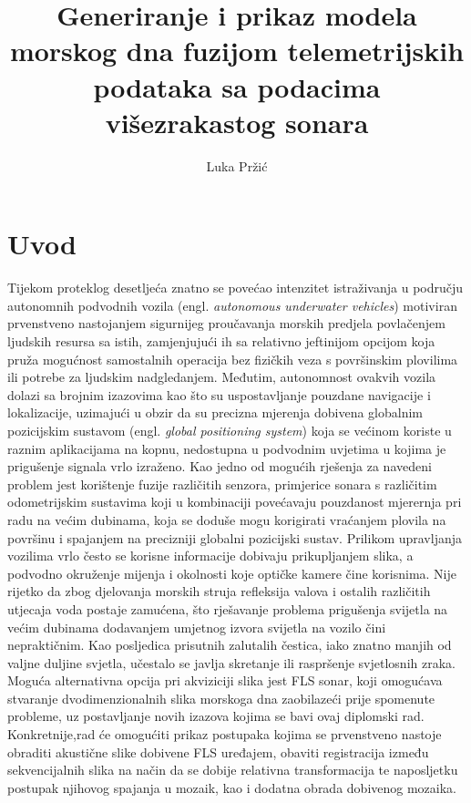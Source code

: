 \documentclass[times, utf8, diplomski]{fer}
\begin{document}

\title{Generiranje i prikaz modela morskog dna fuzijom telemetrijskih podataka sa podacima višezrakastog sonara}

\author{Luka Pržić}
\maketitle
\izvornik

\zahvala{}

\tableofcontents
\chapter{Uvod}
Tijekom proteklog desetljeća znatno se povećao intenzitet istraživanja u području autonomnih podvodnih vozila (engl. \textit{autonomous underwater vehicles}) motiviran prvenstveno nastojanjem sigurnijeg proučavanja morskih predjela povlačenjem ljudskih resursa sa istih, zamjenjujući ih sa relativno jeftinijom opcijom koja pruža mogućnost samostalnih operacija bez fizičkih veza s površinskim plovilima ili potrebe za ljudskim nadgledanjem. Međutim, autonomnost ovakvih vozila dolazi sa brojnim izazovima kao što su uspostavljanje pouzdane navigacije i lokalizacije, uzimajući u obzir da su precizna mjerenja dobivena globalnim pozicijskim sustavom (engl. \textit{global positioning system}) koja se većinom koriste u raznim aplikacijama na kopnu, nedostupna u podvodnim uvjetima u kojima je prigušenje signala vrlo izraženo. Kao jedno od mogućih rješenja za navedeni problem jest korištenje fuzije različitih senzora, primjerice sonara s različitim odometrijskim sustavima koji u kombinaciji povećavaju pouzdanost mjerernja pri radu na većim dubinama, koja se doduše mogu korigirati vraćanjem plovila na površinu i spajanjem na precizniji globalni pozicijski sustav. Prilikom upravljanja vozilima vrlo često se korisne informacije dobivaju prikupljanjem slika, a podvodno okruženje mijenja i okolnosti koje optičke kamere čine korisnima. Nije rijetko da zbog djelovanja morskih struja refleksija valova i ostalih različitih utjecaja voda postaje zamućena, što rješavanje problema prigušenja svijetla na većim dubinama dodavanjem umjetnog izvora svijetla na vozilo čini nepraktičnim. Kao posljedica prisutnih zalutalih čestica, iako  znatno manjih od valjne duljine svjetla, učestalo se javlja skretanje ili raspršenje svjetlosnih zraka. Moguća alternativna opcija pri akviziciji slika jest FLS sonar, koji omogućava stvaranje dvodimenzionalnih slika morskoga dna zaobilazeći prije spomenute probleme, uz postavljanje novih izazova kojima se bavi ovaj diplomski rad. Konkretnije,rad će omogućiti prikaz postupaka kojima se prvenstveno nastoje obraditi akustične slike dobivene FLS uređajem, obaviti registracija između sekvencijalnih slika na način da se dobije relativna transformacija te naposljetku postupak njihovog spajanja u mozaik, kao i dodatna obrada dobivenog mozaika.
\end{document}
